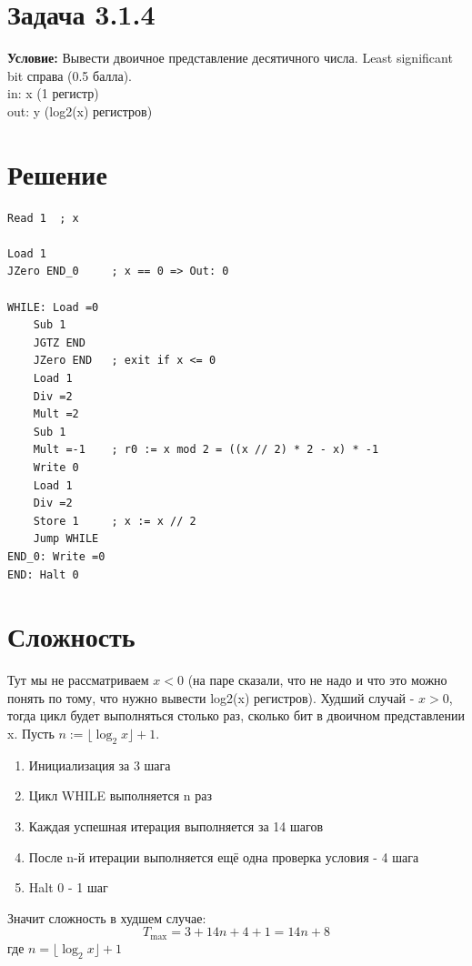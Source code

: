 \documentclass[12pt]{article}
\begin{document}
\section*{Задача 3.1.4}

\textbf{Условие:} Вывести двоичное представление десятичного числа. Least significant bit справа (0.5 балла).\\
in: x (1 регистр) \\
out: y (log2(x) регистров)

\section*{Решение}

\begin{verbatim}
Read 1  ; x

Load 1
JZero END_0     ; x == 0 => Out: 0

WHILE: Load =0
    Sub 1
    JGTZ END
    JZero END   ; exit if x <= 0
    Load 1
    Div =2
    Mult =2
    Sub 1
    Mult =-1    ; r0 := x mod 2 = ((x // 2) * 2 - x) * -1
    Write 0
    Load 1
    Div =2
    Store 1     ; x := x // 2
    Jump WHILE
END_0: Write =0
END: Halt 0
\end{verbatim}

\section*{Сложность}

Тут мы не рассматриваем $x < 0$ (на паре сказали, что не надо и что это можно понять по тому, что нужно вывести log2(x) регистров). Худший случай - $x > 0$, тогда цикл будет выполняться столько раз, сколько бит в двоичном представлении x. Пусть \(n := \lfloor \log_2 x \rfloor + 1\).

\begin{enumerate}
    \item Инициализация за 3 шага
    \item Цикл WHILE выполняется n раз
    \item Каждая успешная итерация выполняется за 14 шагов
    \item После n-й итерации выполняется ещё одна проверка условия - 4 шага
    \item Halt 0 - 1 шаг
\end{enumerate}

Значит сложность в худшем случае:
\[
    T_{\max} = 3 + 14n + 4 + 1 = 14n + 8
\]
где $n = \lfloor \log_2 x \rfloor + 1$
\end{document}
